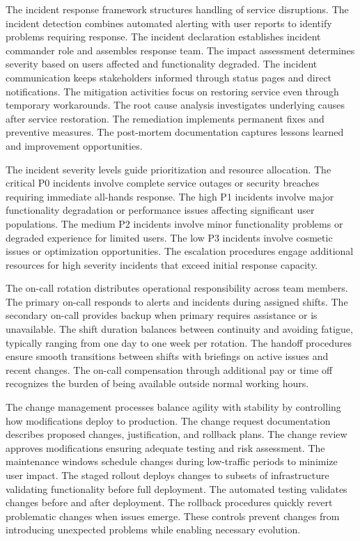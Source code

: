 The incident response framework structures handling of service disruptions. The incident detection combines automated alerting with user reports to identify problems requiring response. The incident declaration establishes incident commander role and assembles response team. The impact assessment determines severity based on users affected and functionality degraded. The incident communication keeps stakeholders informed through status pages and direct notifications. The mitigation activities focus on restoring service even through temporary workarounds. The root cause analysis investigates underlying causes after service restoration. The remediation implements permanent fixes and preventive measures. The post-mortem documentation captures lessons learned and improvement opportunities.

The incident severity levels guide prioritization and resource allocation. The critical P0 incidents involve complete service outages or security breaches requiring immediate all-hands response. The high P1 incidents involve major functionality degradation or performance issues affecting significant user populations. The medium P2 incidents involve minor functionality problems or degraded experience for limited users. The low P3 incidents involve cosmetic issues or optimization opportunities. The escalation procedures engage additional resources for high severity incidents that exceed initial response capacity.

The on-call rotation distributes operational responsibility across team members. The primary on-call responds to alerts and incidents during assigned shifts. The secondary on-call provides backup when primary requires assistance or is unavailable. The shift duration balances between continuity and avoiding fatigue, typically ranging from one day to one week per rotation. The handoff procedures ensure smooth transitions between shifts with briefings on active issues and recent changes. The on-call compensation through additional pay or time off recognizes the burden of being available outside normal working hours.

The change management processes balance agility with stability by controlling how modifications deploy to production. The change request documentation describes proposed changes, justification, and rollback plans. The change review approves modifications ensuring adequate testing and risk assessment. The maintenance windows schedule changes during low-traffic periods to minimize user impact. The staged rollout deploys changes to subsets of infrastructure validating functionality before full deployment. The automated testing validates changes before and after deployment. The rollback procedures quickly revert problematic changes when issues emerge. These controls prevent changes from introducing unexpected problems while enabling necessary evolution.

